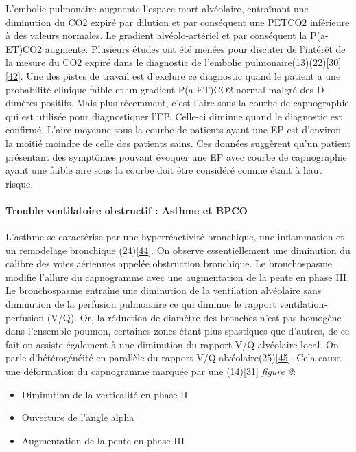 \documentclass[12pt,]{article}
\providecommand{\tightlist}{%
  \setlength{\itemsep}{0pt}\setlength{\parskip}{0pt}}
\let\oldparagraph\paragraph
\renewcommand{\paragraph}[1]{\oldparagraph{#1}\mbox{}}
\begin{document}
L'embolie pulmonaire augmente l'espace mort alvéolaire, entraînant une
diminution du CO2 expiré par dilution et par conséquent une PETCO2
inférieure à des valeurs normales. Le gradient alvéolo-artériel et par
conséquent la P(a-ET)CO2 augmente. Plusieurs études ont été menées pour
discuter de l'intérêt de la mesure du CO2 expiré dans le diagnostic de
l'embolie
pulmonaire(13)(22){[}\protect\hyperlink{ref-jabre2010place}{30}{]}{[}\protect\hyperlink{ref-kline1998preliminary}{42}{]}.
Une des pistes de travail est d'exclure ce diagnostic quand le patient a
une probabilité clinique faible et un gradient P(a-ET)CO2 normal malgré
des D-dimères positifs. Mais plus récemment, c'est l'aire sous la courbe
de capnographie qui est utilisée pour diagnostiquer l'EP. Celle-ci
diminue quand le diagnostic est confirmé. L'aire moyenne sous la courbe
de patients ayant une EP est d'environ la moitié moindre de celle des
patients sains. Ces données suggèrent qu'un patient présentant des
symptômes pouvant évoquer une EP avec courbe de capnographie ayant une
faible aire sous la courbe doit être considéré comme étant à haut
risque.

\hypertarget{trouble-ventilatoire-obstructif-asthme-et-bpco}{%
\paragraph{Trouble ventilatoire obstructif : Asthme et
BPCO}\label{trouble-ventilatoire-obstructif-asthme-et-bpco}}

L'asthme se caractérise par une hyperréactivité bronchique, une
inflammation et un remodelage bronchique
(24){[}\protect\hyperlink{ref-ozier2011pivotal}{44}{]}. On observe
essentiellement une diminution du calibre des voies aériennes appelée
obstruction bronchique. Le bronchospasme modifie l'allure du capnogramme
avec une augmentation de la pente en phase III. Le bronchospasme
entraîne une diminution de la ventilation alvéolaire sans diminution de
la perfusion pulmonaire ce qui diminue le rapport ventilation-perfusion
(V/Q). Or, la réduction de diamètre des bronches n'est pas homogène dans
l'ensemble poumon, certaines zones étant plus spastiques que d'autres,
de ce fait on assiste également à une diminution du rapport V/Q
alvéolaire local. On parle d'hétérogénéité en parallèle du rapport V/Q
alvéolaire(25){[}\protect\hyperlink{ref-hisamuddin2009correlations}{45}{]}.
Cela cause une déformation du capnogramme marquée par une
(14){[}\protect\hyperlink{ref-howe2011use}{31}{]} \emph{figure 2}:

\begin{itemize}
\tightlist
\item
  Diminution de la verticalité en phase II
\item
  Ouverture de l'angle alpha
\item
  Augmentation de la pente en phase III
\end{itemize}
\end{document}
